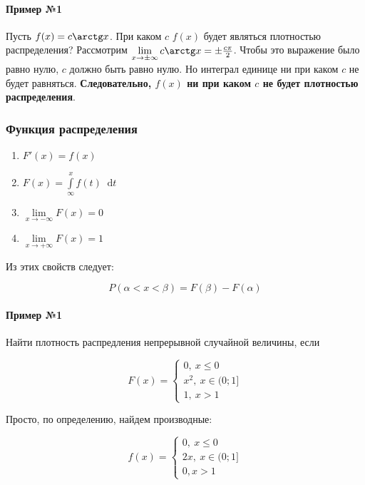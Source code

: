 \documentclass{article}
\newcommand*\diff{\mathop{}\!\mathrm{d}}
\begin{document}
\paragraph{Пример №1}

Пусть $f(x) = c \arctg x$. При каком $c$ $f(x)$ будет являться плотностью распределения? Рассмотрим $\lim\limits_{x \to \pm \infty} c \arctg x = \pm \frac{c \pi}{2}$. Чтобы это выражение было равно нулю, $c$ должно быть равно нулю. Но интеграл единице ни при каком $c$ не будет равняться. \textbf{Следовательно, $f(x)$ ни при каком $c$ не будет плотностью распределения}.

\subsubsection{Функция распределения}

\begin{multicols}{2}
    \begin{enumerate}
        \item $F'(x) = f(x)$
        \item $F(x) = \int\limits_{\infty}^{x} f(t) \diff t$
        \item $\lim\limits_{x \to -\infty} F(x) = 0$
        \item $\lim\limits_{x \to +\infty} F(x) = 1$
    \end{enumerate}        
\end{multicols}

Из этих свойств следует:

$$
P(\alpha < x < \beta) = F(\beta) - F(\alpha)
$$

\paragraph{Пример №1}

Найти плотность распредления непрерывной случайной величины, если

$$
F(x) = \begin{cases}
    0, \ x \le 0 \\
    x^2, \ x \in (0; 1] \\
    1, \ x > 1
\end{cases}
$$

Просто, по определению, найдем производные:

$$
f(x) = \begin{cases}
  0, \ x \le 0 \\
  2x, \ x \in (0; 1] \\
  0, x > 1  
\end{cases}
$$
\end{document}
